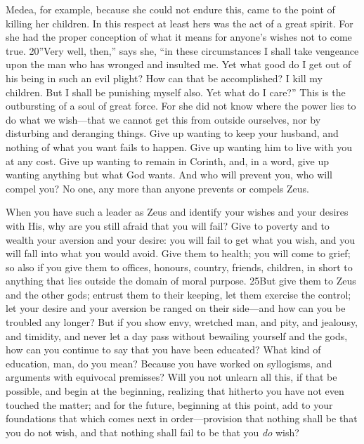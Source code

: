 Medea, for example, because she could not endure this, came to the point of killing her children. In this respect at least hers was the act of a great spirit. For she had the proper conception of what it means for anyone's wishes not to come true. 20''Very well, then,'' says she, ``in these circumstances I shall take vengeance upon the man who has wronged and insulted me. Yet what good do I get out of his being in such an evil plight? How can that be accomplished? I kill my children. But I shall be punishing myself also. Yet what do I care?'' This is the outbursting of a soul of great force. For she did not know where the power lies to do what we wish—that we cannot get this from outside ourselves, nor by disturbing and deranging things. Give up wanting to keep your husband, and nothing of what you want fails to happen. Give up wanting him to live with you at any cost. Give up wanting to remain in Corinth, and, in a word, give up wanting anything but what God wants. And who will prevent you, who will compel you? No one, any more than anyone prevents or compels Zeus.

When you have such a leader as Zeus and identify your wishes and your desires with His, why are you still afraid that you will fail? Give to poverty and to wealth your aversion and your desire: you will fail to get what you wish, and you will fall into what you would avoid. Give them to health; you will come to grief; so also if you give them to offices, honours, country, friends, children, in short to anything that lies outside the domain of moral purpose. 25But give them to Zeus and the other gods; entrust them to their keeping, let them exercise the control; let your desire and your aversion be ranged on their side—and how can you be troubled any longer? But if you show envy, wretched man, and pity, and jealousy, and timidity, and never let a day pass without bewailing yourself and the gods, how can you continue to say that you have been educated? What kind of education, man, do you mean? Because you have worked on syllogisms, and arguments with equivocal premisses? Will you not unlearn all this, if that be possible, and begin at the beginning, realizing that hitherto you have not even touched the matter; and for the future, beginning at this point, add to your foundations that which comes next in order—provision that nothing shall be that you do not wish, and that nothing shall fail to be that you \emph{do} wish?

